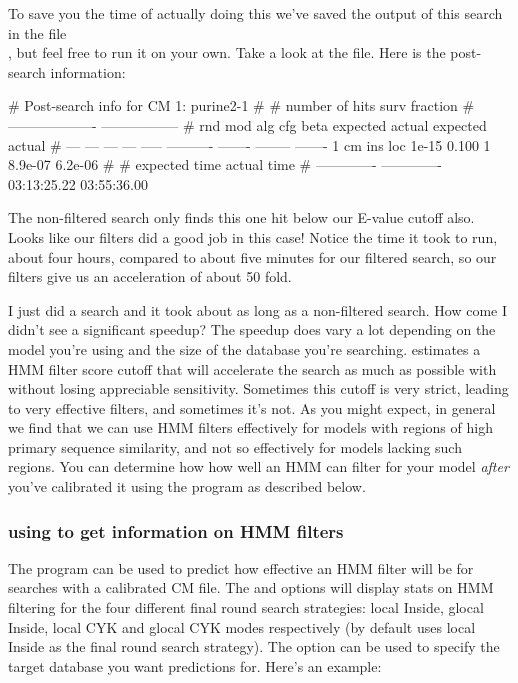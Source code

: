 To save you the time of actually doing this we've saved the
output of this search in the file\\
 ,
but feel free to run it on your own. Take a look at the file. Here is
the post-search information:


{\samepage
\begin{sreoutput}
# Post-search info for CM 1: purine2-1
#
#                              number of hits       surv fraction  
#                            -------------------  -----------------
# rnd  mod  alg  cfg   beta    expected   actual  expected   actual
# ---  ---  ---  ---  -----  ----------  -------  --------  -------
    1   cm  ins  loc  1e-15       0.100        1   8.9e-07  6.2e-06
#
# expected time    actual time
# -------------  -------------
    03:13:25.22    03:55:36.00
\end{sreoutput}
}

The non-filtered search only finds this one hit below our E-value
cutoff also. Looks like our filters did a good job in this case!
Notice the time it took to run, about four hours, compared to about five
minutes for our filtered search, so our filters give us an
acceleration of about 50 fold. 

\begin{srefaq}{I just did a search and it took about as long as a
    non-filtered search. How come I didn't see a significant speedup?}
  The speedup does vary a lot depending on the model you're using and
  the size of the database you're searching. 
  estimates a HMM filter score cutoff that will accelerate the search
  as much as possible with without losing appreciable
  sensitivity. Sometimes this cutoff is very strict, leading to very
  effective filters, and sometimes it's not. As you might expect, in
  general we find that we can use HMM filters effectively for models
  with regions of high primary sequence similarity, and not so
  effectively for models lacking such regions. You can determine how
  how well an HMM can filter for your model \emph{after} you've
  calibrated it using the  program as described below.
\end{srefaq}


\subsubsection{using  to get information on HMM filters}

The  program can be used to predict how effective an
HMM filter will be for searches with a calibrated CM file. The
 and  options will display stats on
HMM filtering for the four different final round search strategies:
local Inside, glocal Inside, local CYK and glocal CYK modes
respectively (by default  uses local Inside as the
final round search strategy). The  option can be
used to specify the target database you want predictions for. 
Here's an example:

